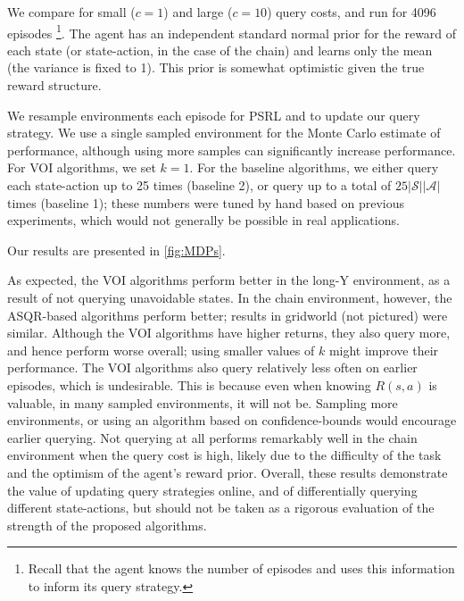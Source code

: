 \documentclass{article}
\newcommand{\St}{\mathcal{S}}
\newcommand{\A}{\mathcal{A}}
\begin{document}
We compare for small ($c=1$) and large ($c=10$) query costs, and run for 4096 episodes \footnote{
Recall that the agent knows the number of episodes and uses this information to inform its query strategy.
}.
The agent has an independent standard normal prior for the reward of each state (or state-action, in the case of the chain) and learns only the mean (the variance is fixed to 1).
This prior is somewhat optimistic given the true reward structure.


We resample environments each episode for PSRL and to update our query strategy.
We use a single sampled environment for the Monte Carlo estimate of performance, although using more samples can significantly increase performance. %
For VOI algorithms, we set $k=1$. 
For the baseline algorithms, we either query each state-action up to 25 times (baseline 2), or query up to a total of $25 |\St| |\A|$ times (baseline 1); 
these numbers were tuned by hand based on previous experiments, which would not generally be possible in real applications.

Our results are presented in \autoref{fig:MDPs}.

As expected, the VOI algorithms perform better in the long-Y environment, as a result of not querying unavoidable states.
In the chain environment, however, the ASQR-based algorithms perform better; results in gridworld (not pictured) were similar.
Although the VOI algorithms have higher returns, they also query more, and hence perform worse overall; using smaller values of $k$ might improve their performance.
The VOI algorithms also query relatively less often on earlier episodes, which is undesirable.
This is because even when knowing $R(s,a)$ is valuable, in many sampled environments, it will not be.
Sampling more environments, or using an algorithm based on confidence-bounds would encourage earlier querying.
Not querying at all performs remarkably well in the chain environment when the query cost is high, likely due to the difficulty of the task and the optimism of the agent's reward prior.
Overall, these results demonstrate the value of updating query strategies online, and of differentially querying different state-actions, but should not be taken as a rigorous evaluation of the strength of the proposed algorithms.
\end{document}

